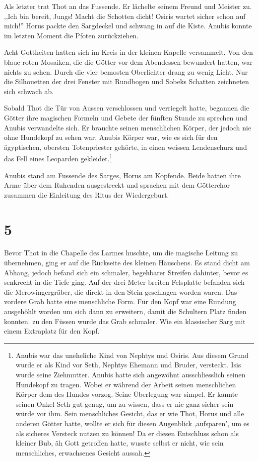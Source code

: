 Als letzter trat Thot an das Fussende. Er lächelte seinem Freund und Meister zu. ,,Ich bin bereit, Jungs! Macht die Schotten dicht! Osiris wartet sicher schon auf mich!'' Horus packte den Sargdeckel und schwang in auf die Kiste. Anubis konnte im letzten Moment die Pfoten zurückziehen.

Acht Gottheiten hatten sich im Kreis in der kleinen Kapelle versammelt. Von den blaue-roten Mosaiken, die die Götter vor dem Abendessen bewundert hatten, war nichts zu sehen. Durch die vier bemosten Oberlichter drang zu wenig Licht. Nur die Silhouetten der drei Fenster mit Rundbogen und Sobeks Schatten zeichneten sich schwach ab.

Sobald Thot die Tür von Aussen verschlossen und verriegelt hatte, begannen die Götter ihre magischen Formeln und Gebete der fünften Stunde zu sprechen und Anubis verwandelte sich. Er brauchte seinen menschlichen Körper, der jedoch nie ohne Hundekopf zu sehen war. Anubis Körper war, wie es sich für den ägyptischen, obersten Totenpriester gehörte, in einen weissen Lendenschurz und das Fell eines Leoparden gekleidet.\footnote{Anubis war das uneheliche Kind von Nephtys und Osiris. Aus diesem Grund wurde er als Kind vor Seth, Nephtys Ehemann und Bruder, versteckt. Isis wurde seine Ziehmutter. Anubis hatte sich angewöhnt ausschliesslich seinen Hundekopf zu tragen. Wobei er während der Arbeit seinen menschlichen Körper dem des Hundes vorzog. Seine Überlegung war simpel. Er kannte seinen Onkel Seth gut genug, um zu wissen, dass er nie ganz sicher sein würde vor ihm. Sein menschliches Gesicht, das er wie Thot, Horus und alle anderen Götter hatte, wollte er sich für diesen Augenblick ,aufsparen', um es als sicheres Versteck nutzen zu können! Da er diesen Entschluss schon als kleiner Bub, äh Gott getroffen hatte, wusste selbst er nicht, wie sein menschliches, erwachsenes Gesicht aussah.}

Anubis stand am Fussende des Sarges, Horus am Kopfende. Beide hatten ihre Arme über dem Ruhenden ausgestreckt und sprachen mit dem Götterchor zusammen die Einleitung des Ritus der Wiedergeburt.


\section*{5}

Bevor Thot in die Chapelle des Larmes huschte, um die magische Leitung zu übernehmen, ging er auf die Rückseite des kleinen Häuschens. Es stand dicht am Abhang, jedoch befand sich ein schmaler, begehbarer Streifen dahinter, bevor es senkrecht in die Tiefe ging. Auf der drei Meter breiten Felsplatte befanden sich die Merowingergräber, die direkt in den Stein geschlagen worden waren. Das vordere Grab hatte eine menschliche Form. Für den Kopf war eine Rundung ausgehöhlt worden um sich dann zu erweitern, damit die Schultern Platz finden konnten. zu den Füssen wurde das Grab schmaler. Wie ein klassischer Sarg mit einem Extraplatz für den Kopf.

